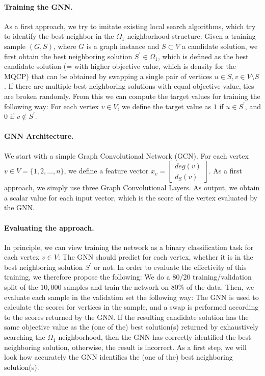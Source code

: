 \documentclass[draft,final]{vutinfth} %
\begin{document}
\paragraph{Training the GNN.} As a first approach, we try to imitate existing local search algorithms, which try to identify the best neighbor in the $\Omega_1$ neighborhood structure: Given a training sample $(G, S)$, where $G$ is a graph instance and $S \subset V$ a candidate solution, we first obtain the best neighboring solution $S^\prime \in \Omega_1$, which is defined as the best candidate solution (= with higher objective value, which is density for the MQCP) that can be obtained by swapping a single pair of vertices $u \in S, v \in V \setminus S$. If there are multiple best neighboring solutions with equal objective value, ties are broken randomly. From this we can compute the target values for training the following way: For each vertex $v \in V$, we define the target value as $1$ if $u \in S^\prime$, and $0$ if $v \notin S^\prime$. 

\paragraph{GNN Architecture.} We start with a simple Graph Convolutional Network (GCN). For each vertex $v \in V = \{1,2,\dots,n\}$, we define a feature vector 
$x_v = 
\begin{bmatrix} deg(v) \\
    d_S(v) 
\end{bmatrix}$. 
As a first approach, we simply use three Graph Convolutional Layers. As output, we obtain a scalar value for each input vector, which is the score of the vertex evaluated by the GNN. 

\paragraph{Evaluating the approach.} 
In principle, we can view training the network as a binary classification task for each vertex $v \in V$: The GNN should predict for each vertex, whether it is in the best neighboring solution $S^\prime$ or not. 
In order to evaluate the effectivity of this training, we therefore propose the following: We do a $80/20$ training/validation split of the $10,000$ samples and train the network on $80\%$ of the data. Then, we evaluate each sample in the validation set the following way: The GNN is used to calculate the scores for vertices in the sample, and a swap is performed according to the scores returned by the GNN. If the resulting candidate solution has the same objective value as the (one of the) best solution(s) returned by exhaustively searching the $\Omega_1$ neighborhood, then the GNN has correctly identified the best neighboring solution, otherwise, the result is incorrect. As a first step, we will look how accurately the GNN identifies the (one of the) best neighboring solution(s). 
\end{document}
